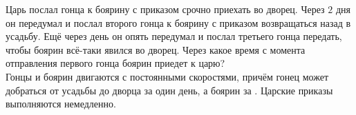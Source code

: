 Царь послал гонца к боярину с приказом срочно приехать во дворец. Через $2$ дня он передумал и послал второго гонца к боярину с приказом возвращаться назад в усадьбу. Ещё через день он опять передумал и послал третьего гонца передать, чтобы боярин всё-таки явился во дворец. Через какое время с момента отправления первого гонца боярин приедет к царю?\\
Гонцы и боярин двигаются с постоянными скоростями, причём гонец может добраться от усадьбы до дворца за один день, а боярин за . Царские приказы выполняются немедленно.